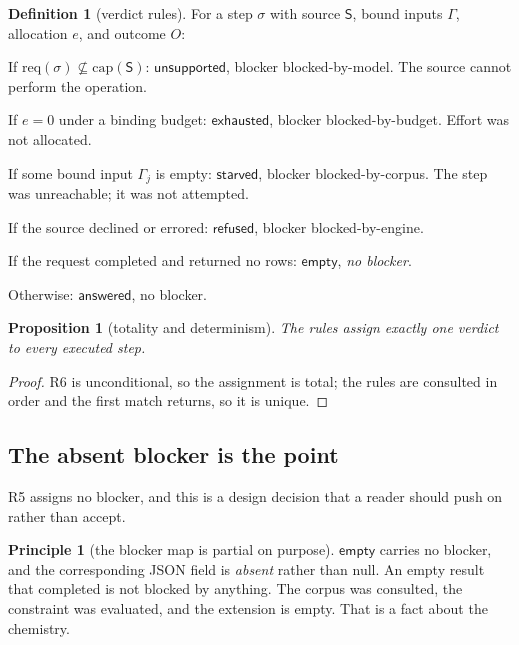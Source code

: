 \documentclass[11pt,a4paper]{article}
\theoremstyle{plain}
\newtheorem{proposition}[theorem]{Proposition}
\theoremstyle{definition}
\newtheorem{definition}[theorem]{Definition}
\newtheorem{principle}[theorem]{Principle}
\theoremstyle{remark}
\newcommand{\Step}{\sigma}
\newcommand{\Src}{\mathsf{S}}
\newcommand{\Capset}{\mathrm{cap}}
\newcommand{\Req}{\mathrm{req}}
\newcommand{\Bind}{\Gamma}
\newcommand{\vans}{\textsf{answered}}
\newcommand{\vempty}{\textsf{empty}}
\newcommand{\vsurf}{\textsf{unsupported}}
\newcommand{\vtime}{\textsf{exhausted}}
\newcommand{\vref}{\textsf{refused}}
\newcommand{\vstarve}{\textsf{starved}}
\newcommand{\bmdl}{\textsf{blocked-by-model}}
\newcommand{\bcorp}{\textsf{blocked-by-corpus}}
\newcommand{\beng}{\textsf{blocked-by-engine}}
\newcommand{\bbud}{\textsf{blocked-by-budget}}
\begin{document}
\begin{definition}[verdict rules]
\label{def:rules}
For a step $\Step$ with source $\Src$, bound inputs $\Bind$, allocation
$e$, and outcome $O$:
\begin{description}[leftmargin=3.2em,style=nextline]
\item[\textnormal{R1}] If $\Req(\Step) \not\subseteq \Capset(\Src)$:
  $\vsurf$, blocker \bmdl. The source cannot perform the operation.
\item[\textnormal{R2}] If $e = 0$ under a binding budget: $\vtime$,
  blocker \bbud. Effort was not allocated.
\item[\textnormal{R3}] If some bound input $\Bind_j$ is empty:
  $\vstarve$, blocker \bcorp. The step was unreachable; it was not
  attempted.
\item[\textnormal{R4}] If the source declined or errored: $\vref$,
  blocker \beng.
\item[\textnormal{R5}] If the request completed and returned no rows:
  $\vempty$, \emph{no blocker}.
\item[\textnormal{R6}] Otherwise: $\vans$, no blocker.
\end{description}
\end{definition}

\begin{proposition}[totality and determinism]
The rules assign exactly one verdict to every executed step.
\end{proposition}
\begin{proof}
R6 is unconditional, so the assignment is total; the rules are consulted
in order and the first match returns, so it is unique.
\end{proof}

\subsection{The absent blocker is the point}

R5 assigns no blocker, and this is a design decision that a reader
should push on rather than accept.

\begin{principle}[the blocker map is partial on purpose]
\label{prin:noblocker}
$\vempty$ carries no blocker, and the corresponding JSON field is
\emph{absent} rather than null. An empty result that completed is not
blocked by anything. The corpus was consulted, the constraint was
evaluated, and the extension is empty. That is a fact about the
chemistry.
\end{principle}
\end{document}
